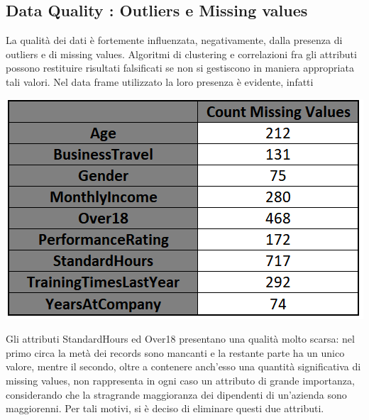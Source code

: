 \documentclass[english]{article}
\begin{document}
\subsection{Data Quality : Outliers e Missing values}
La qualità dei dati è fortemente influenzata, negativamente, dalla presenza di outliers e di missing values. Algoritmi di clustering e correlazioni fra gli attributi possono restituire risultati falsificati se non si gestiscono in maniera appropriata tali valori. 
Nel data frame utilizzato la loro presenza è evidente, infatti

\begin{center}
\includegraphics[scale=1.5]{missingvalues.png}
\end{center}
Gli attributi StandardHours ed Over18 presentano una qualità molto scarsa: nel primo circa la metà dei records sono mancanti e la restante parte ha un unico valore, mentre il secondo, oltre a contenere anch'esso una quantità significativa di missing values, non rappresenta in ogni caso un attributo di grande importanza, considerando che la stragrande maggioranza dei dipendenti di un'azienda sono maggiorenni. Per tali motivi, si è deciso di eliminare questi due attributi.
\end{document}
